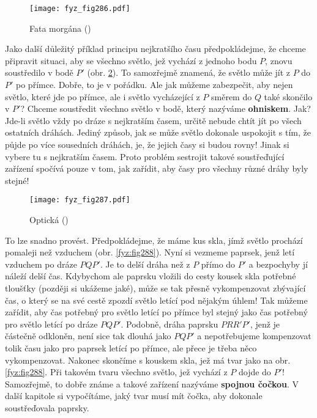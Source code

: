 {    \begin{figure}[ht!] %
      \centering
      \texttt{[image: fyz\_fig286.pdf]}
      \caption{Fata morgána
               (\cite[s.~351]{Feynman01})}
      \label{fyz:fig286}
    \end{figure}

    Jako další důležitý příklad principu nejkratšího času předpokládejme, že chceme připravit 
    situaci, aby se všechno světlo, jež vychází z jednoho bodu \(P\), znovu soustředilo v bodě 
    \(P'\) (obr. \ref{fyz:fig287}). To samozřejmě znamená, že světlo může jít z \(P\) do \(P'\) po 
    přímce. Dobře, to je v pořádku. Ale jak můžeme zabezpečit, aby nejen světlo, které jde po 
    přímce, ale i světlo vycházející z \(P\) směrem do \(Q\) také skončilo v \(P'\)? Chceme 
    soustředit všechno světlo v bodě, který nazýváme \textbf{ohniskem}. Jak? Jde-li světlo vždy po 
    dráze s nejkratším časem, určitě nebude chtít jít po všech ostatních dráhách. Jediný způsob, 
    jak se může světlo dokonale uspokojit s tím, že půjde po více sousedních dráhách, je, že jejich 
    časy si budou rovny! Jinak si vybere tu s nejkratším časem. Proto problém sestrojit takové 
    soustřeďující zařízení spočívá pouze v tom, jak zařídit, aby časy pro všechny různé dráhy byly 
    stejné!
    
    \begin{figure}[ht!] %
      \centering
      \texttt{[image: fyz\_fig287.pdf]}
      \caption{Optická 
               (\cite[s.~351]{Feynman01})}
      \label{fyz:fig287}
    \end{figure}

    To lze snadno provést. Předpokládejme, že máme kus skla, jímž světlo prochází pomaleji než 
    vzduchem (obr. \ref{fyz:fig288}). Nyní si vezmeme paprsek, jenž letí vzduchem po dráze 
    \(PQP'\). Je to delší dráha než z \(P\) přímo do \(P'\) a bezpochyby jí náleží delší čas. 
    Kdybychom ale paprsku vložili do cesty kousek skla potřebné tloušťky (později si ukážeme jaké), 
    může se tak přesně vykompenzovat zbývající čas, o který se na své cestě zpozdí světlo letící 
    pod nějakým úhlem! Tak můžeme zařídit, aby čas potřebný pro světlo letící po přímce byl stejný 
    jako čas potřebný pro světlo letící po dráze \(PQP'\). Podobně, dráha paprsku \(PRR'P'\), jenž 
    je částečně odkloněn, není sice tak dlouhá jako \(PQP'\) a nepotřebujeme kompenzovat tolik času 
    jako pro paprsek letící po přímce, ale přece je třeba něco vykompenzovat. Nakonec skončíme s 
    kouskem skla, jež má tvar jako na obr. \ref{fyz:fig288}. Při takovém tvaru všechno světlo, jež 
    vychází z \(P\) dojde do \(P'\)! Samozřejmě, to dobře známe a takové zařízení nazýváme 
    \textbf{spojnou čočkou}. V další kapitole si vypočítáme, jaký tvar musí mít čočka, aby dokonale 
    soustřeďovala paprsky.

}

